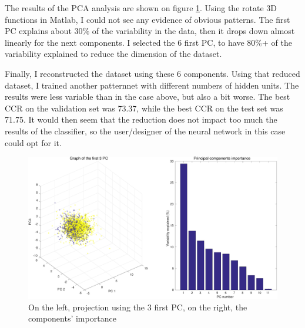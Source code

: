 \documentclass[11pt, a4paper]{article}
\begin{document}
The results of the PCA analysis are shown on figure
\ref{fig:classification_pca}. Using the rotate 3D functions in Matlab,
I could not see any evidence of obvious patterns. The first PC
explains about 30\% of the variability in the data, then it drops down
almost linearly for the next components. I selected the 6 first PC, to
have 80\%+ of the variability explained to reduce the dimension of the
dataset.

Finally, I reconstructed the dataset using these 6 components. Using
that reduced dataset, I trained another patternnet with different
numbers of hidden units. The results were less variable than in the
case above, but also a bit worse. The best CCR on the validation set
was 73.37, while the best CCR on the test set was 71.75. It would then
seem that the reduction does not impact too much the results of the
classifier, so the user/designer of the neural network in this case
could opt for it.

\begin{figure}[H]
  \centering
  \includegraphics[scale=.35]{classification_pca.pdf}
  \caption{On the left, projection using the 3 first PC, on the right,
    the components' importance}
  \label{fig:classification_pca}
\end{figure}
\end{document}
